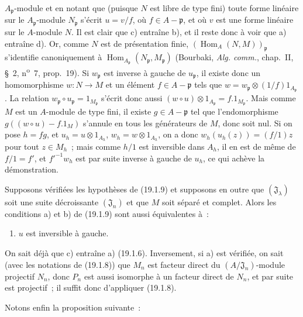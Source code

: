 $A_{\mathfrak p}$-module et en notant que (puisque $N$ est libre de type fini)
toute forme linéaire sur le $A_{\mathfrak p}$-module $N_{\mathfrak p}$ s'écrit
$u=v/f$, où $f\in A-\mathfrak p$, et où $v$ est une forme linéaire sur le
$A$-module $N$. Il est clair que c) entraîne b), et il reste donc à voir que a)
entraîne d). Or, comme $N$ est de présentation finie,
$(\operatorname{Hom}_A(N,M))_{\mathfrak p}$ s'identifie canoniquement à
$\operatorname{Hom}_{A_{\mathfrak p}}(N_{\mathfrak p},M_{\mathfrak p})$
(Bourbaki, \emph{Alg. comm.}, chap.~II, §~2, n\textsuperscript{o}~7,
prop.~19). Si $w_{\mathfrak p}$ est inverse à gauche de $u_{\mathfrak p}$, il
existe donc un homomorphisme $w:N\to M$ et un élément $f\in A-\mathfrak p$
tels que $w=w_{\mathfrak p}\otimes(1/f)1_{A_{\mathfrak p}}$. La relation
$w_{\mathfrak p}\circ u_{\mathfrak p}=1_{M_{\mathfrak p}}$ s'écrit donc aussi
$(w\circ u)\otimes1_{A_{\mathfrak p}}=f.1_{M_{\mathfrak p}}$. Mais comme $M$
est un $A$-module de type fini, il existe $g\in A-\mathfrak p$ tel que
l'endomorphisme $g((w\circ u)-f.1_M)$ s'annule en tous les générateurs de $M$,
donc soit nul. Si on pose $h=fg$, et
$u_h=u\otimes1_{A_h}$, $w_h=w\otimes1_{A_h}$, on a donc
$w_h(u_h(z))=(f/1)z$ pour tout $z\in M_h$~; mais comme $h/1$ est inversible
dans $A_h$, il en est de même de $f/1=f'$, et $f'^{-1}w_h$ est par suite
inverse à gauche de $u_h$, ce qui achève la démonstration.

\begin{proposition}[19.1.13]
\label{0.19.1.13-fr}
Supposons vérifiées les hypothèses de (19.1.9) et supposons en outre que
$(\mathfrak J_\lambda)$ soit une suite décroissante $(\mathfrak J_n)$ et que
$M$ soit séparé et complet. Alors les conditions a) et b) de (19.1.9) sont
aussi équivalentes à~:
\begin{enumerate}
  \item[c)] $u$ est inversible à gauche.
\end{enumerate}
\end{proposition}

On sait déjà que c) entraîne a) (19.1.6). Inversement, si a) est vérifiée, on
sait (avec les notations de (19.1.8)) que $M_n$ est facteur direct du
$(A/\mathfrak J_n)$-module projectif $N_n$, donc $P_n$ est aussi isomorphe à
un facteur direct de $N_n$, et par suite est projectif~; il suffit donc
d'appliquer (19.1.8).

Notons enfin la proposition suivante~:

